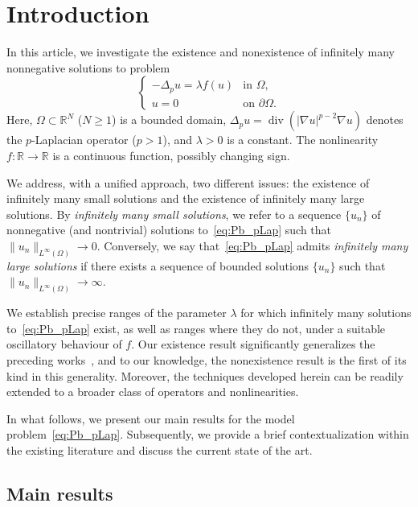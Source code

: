 \documentclass[10pt,twoside,english,reqno,a4paper]{amsart}
\theoremstyle{plain}
\theoremstyle{plain}
\theoremstyle{definition}
\theoremstyle{remark}
\numberwithin{equation}{section}
\newcommand{\R}{\mathbb{R}}
\def\lio{{L^{\infty}(\Omega)}}
\begin{document}
\section{Introduction}

In this article, we investigate the existence and nonexistence of infinitely many nonnegative solutions to problem
\begin{equation}
	\label{eq:Pb_pLap}
	\begin{cases}
		-\Delta_p u = \lambda f(u) & \text{in } \Omega,\\
		u=0 & \text{on } \partial\Omega.
	\end{cases}
\end{equation}
Here, $\Omega\subset \R^N$ ($N\geq 1$) is a bounded domain, $\Delta_p u = \operatorname{div}(|\nabla u|^{p-2} \nabla u)$ denotes the $p$-Laplacian operator ($p>1$), and $\lambda>0$ is a constant. The nonlinearity $f\colon \R \to \R$ is a continuous function, possibly changing sign.

We address, with a unified approach, two different issues: the existence of infinitely many small solutions and the existence of infinitely many large solutions. By \textit{infinitely many small solutions}, we refer to a sequence $\{u_n\}$ of nonnegative (and nontrivial) solutions to~\eqref{eq:Pb_pLap} such that $\|u_n\|_\lio \to 0$. Conversely, we say that~\eqref{eq:Pb_pLap} admits \textit{infinitely many large solutions} if there exists a sequence of bounded solutions $\{u_n\}$ such that $\|u_n\|_\lio \to \infty$.

We establish precise ranges of the parameter $\lambda$ for which infinitely many solutions to~\eqref{eq:Pb_pLap} exist, as well as 
ranges where they do not, under a suitable oscillatory behaviour of $f$. Our existence result significantly generalizes the preceding works~\cite{AC02, CMM25, OZ96}, and to our knowledge, the nonexistence result is the first of its kind in this generality. Moreover, the techniques developed herein can be readily extended to a broader class of operators and nonlinearities.

In what follows, we present our main results for the model problem~\eqref{eq:Pb_pLap}. Subsequently, we provide a brief contextualization within the existing literature and discuss the current state of the art.

\subsection{Main results} 
\end{document}
